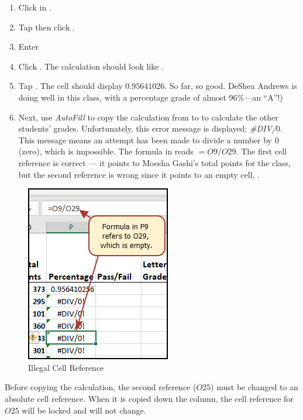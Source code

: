 \begin{enumbox}
	\begin{enumerate}
		\item Click in .
		\item Tap \fmtTyping{=} then click . 
		\item Enter \fmtTyping{/}
		\item Click . The calculation should look like .
		\item Tap . The cell should display $ 0.95641026 $. So far, so good. DeShea Andrews is doing well in this class, with a percentage grade of almost 96\%---an ``A''!)
		\item Next, use \textit{AutoFill} to copy the calculation from  to  to calculate the other students' grades. Unfortunately, this error message is displayed: \textit{\#DIV/$ 0 $}. This message means an attempt has been made to divide a number by $ 0 $ (zero), which is impossible. The formula in  reads $ =O9/O29 $. The first cell reference is correct --- it points to Moesha Gashi's total points for the class, but the second reference is wrong since it points to an empty cell, .
	\end{enumerate}
\end{enumbox}

\begin{figure}[H]
	\centering
	\includegraphics[width=\maxwidth{.50\linewidth}]{gfx/ch03_fig07a}
	\caption{Illegal Cell Reference}
	\label{03:fig07a}
\end{figure}

Before copying the calculation, the second reference ($ O25 $) must be changed to an absolute cell reference. When it is copied down the column, the cell reference for $ O25 $ will be locked and will not change.

